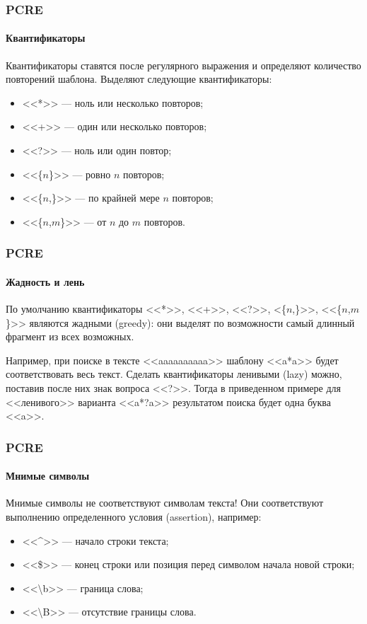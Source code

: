 \begin{frame}
    \frametitle{PCRE}
    \framesubtitle{Квантификаторы}
    
    \alert{Квантификаторы} ставятся после регулярного выражения и определяют количество повторений шаблона. Выделяют следующие квантификаторы:
    \begin{itemize}
        \item{} <<*>> --- ноль или несколько повторов;
        \item{} <<+>> --- один или несколько повторов;
        \item{} <<?>> --- ноль или один повтор;
        \item{} <<\{$n$\}>> --- ровно $n$ повторов;
        \item{} <<\{$n$,\}>> --- по крайней мере $n$ повторов;
        \item{} <<\{$n$,$m$\}>> --- от $n$ до $m$ повторов.
    \end{itemize}
\end{frame}

\begin{frame}
    \frametitle{PCRE}
    \framesubtitle{Жадность и лень}
    
    По умолчанию квантификаторы <<*>>, <<+>>, <<?>>, <\{$n$,\}>>, <<\{$n$,$m$\}>> являются \alert{жадными} (greedy): они выделят по возможности самый длинный фрагмент из всех возможных. 
    
    Например, при поиске в тексте <<aaaaaaaaaa>> шаблону <<a*a>> будет соответствовать весь текст. Сделать квантификаторы \alert{ленивыми} (lazy) можно, поставив после них знак вопроса <<?>>. Тогда в приведенном примере для <<ленивого>> варианта <<a*?a>> результатом поиска будет одна буква <<a>>.    
\end{frame}


\begin{frame}
    \frametitle{PCRE}
    \framesubtitle{Мнимые символы}
    
    \alert{Мнимые символы} не соответствуют символам текста! Они соответствуют выполнению определенного условия (assertion), например:
    \begin{itemize}
        \item{} <<\^{}>> --- начало строки текста;
        \item{} <<\$>> --- конец строки или позиция перед символом начала новой строки;
        \item{} <<\textbackslash b>> --- граница слова;
        \item{} <<\textbackslash B>> --- отсутствие границы слова.
    \end{itemize}
\end{frame}


